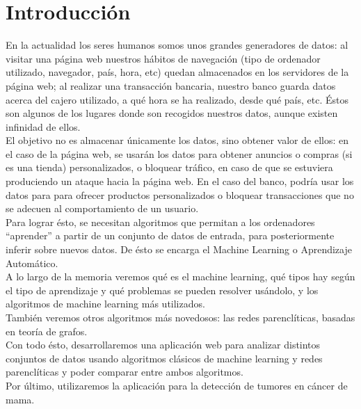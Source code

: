 \chapter{Introducción}

En la actualidad los seres humanos somos unos grandes generadores de datos: al visitar una página web nuestros hábitos de navegación (tipo de ordenador utilizado, navegador, país, hora, etc) quedan almacenados en los servidores de la página web; al realizar una transacción bancaria, nuestro banco guarda datos acerca del cajero utilizado, a qué hora se ha realizado, desde qué país, etc. Éstos son algunos de los lugares donde son recogidos nuestros datos, aunque existen infinidad de ellos.\\

El objetivo no es almacenar únicamente los datos, sino obtener valor de ellos: en el caso de la página web, se usarán los datos para obtener anuncios o compras (si es una tienda) personalizados, o bloquear tráfico, en caso de que se estuviera produciendo un ataque hacia la página web. En el caso del banco, podría usar los datos para para ofrecer productos personalizados o bloquear transacciones que no se adecuen al comportamiento de un usuario.\\

Para lograr ésto, se necesitan algoritmos que permitan a los ordenadores ``aprender'' a partir de un conjunto de datos de entrada, para posteriormente inferir sobre nuevos datos. De ésto se encarga el Machine Learning o Aprendizaje Automático.\\

A lo largo de la memoria veremos qué es el machine learning, qué tipos hay según el tipo de aprendizaje y qué problemas se pueden resolver usándolo, y los algoritmos de machine learning más utilizados.\\

También veremos otros algoritmos más novedosos: las redes parenclíticas, basadas en teoría de grafos.\\

Con todo ésto, desarrollaremos una aplicación web para analizar distintos conjuntos de datos usando algoritmos clásicos de machine learning y redes parenclíticas y poder comparar entre ambos algoritmos.\\

Por último, utilizaremos la aplicación para la detección de tumores en cáncer de mama.  